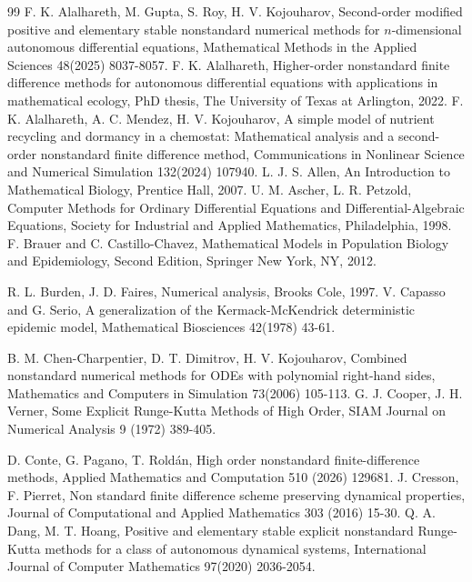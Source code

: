 \documentclass[12pt]{article}
\theoremstyle{definition}
\theoremstyle{remark}
\numberwithin{equation}{section}
\begin{document}
\begin{thebibliography}{99}
F. K. Alalhareth, M. Gupta, S. Roy, H. V. Kojouharov, Second-order modified positive and elementary stable nonstandard numerical methods for $n$-dimensional autonomous differential equations, Mathematical Methods in the Applied Sciences 48(2025) 8037-8057.
F. K. Alalhareth, Higher-order nonstandard finite difference methods for
autonomous differential equations with applications in
mathematical ecology, PhD thesis, The University of Texas at Arlington, 2022.
F. K. Alalhareth, A. C. Mendez, H. V. Kojouharov, A simple model of nutrient recycling and dormancy in a chemostat: Mathematical analysis and a second-order nonstandard finite difference method, Communications in Nonlinear Science and Numerical Simulation 132(2024) 107940.
L. J. S. Allen, An Introduction to Mathematical Biology, Prentice Hall,  2007.
U. M. Ascher, L. R. Petzold, Computer Methods for Ordinary Differential Equations and
Differential-Algebraic Equations, Society for Industrial and Applied Mathematics, Philadelphia,
1998.
F. Brauer and C. Castillo-Chavez, Mathematical Models in Population Biology and Epidemiology, Second Edition, Springer New York, NY, 2012.

R. L. Burden, J. D. Faires, Numerical analysis, Brooks Cole, 1997.
V. Capasso and G. Serio, {A generalization of the Kermack-McKendrick deterministic epidemic model}, 	Mathematical Biosciences {42}(1978) 43-61.


B. M. Chen-Charpentier, D. T. Dimitrov, H. V. Kojouharov, Combined nonstandard numerical methods for ODEs with polynomial right-hand sides,  Mathematics and Computers in Simulation 73(2006) 105-113.
G. J. Cooper, J. H. Verner, Some Explicit Runge-Kutta Methods of High Order, SIAM Journal
on Numerical Analysis 9 (1972) 389-405.









D. Conte, G. Pagano, T. Rold\'an, High order nonstandard finite-difference methods, Applied Mathematics and Computation 510 (2026) 129681.
J. Cresson, F. Pierret, Non standard finite difference scheme preserving
dynamical properties, Journal of Computational and Applied Mathematics 303 (2016) 15-30.
Q. A. Dang, M. T. Hoang, Positive and elementary stable explicit nonstandard Runge-Kutta methods for a class of autonomous dynamical systems, International Journal of Computer Mathematics 97(2020) 2036-2054.


\end{thebibliography}
\end{document}
